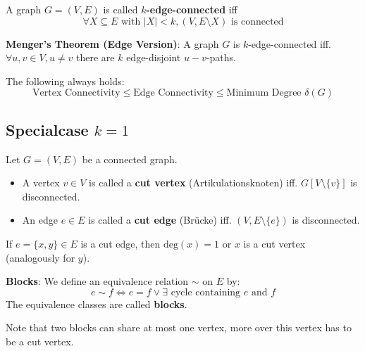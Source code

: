 \begin{definition}
	A graph $G = (V, E)$ is called \textbf{$k$-edge-connected} iff
	$$\forall X \subseteq E \text{ with } |X| \lt k, (V, E \setminus X) \text{ is connected}$$
\end{definition}

\begin{theorem}
	\textbf{Menger's Theorem (Edge Version)}: A graph $G$ is $k$-edge-connected iff. $\forall u, v \in V, u \neq v$ there are $k$ edge-disjoint $u-v$-paths.
\end{theorem}

\begin{remark}
	The following always holds:
	$$\text{Vertex Connectivity} \le \text{Edge Connectivity} \le \text{Minimum Degree } \delta(G)$$
\end{remark}

\subsection{Specialcase $k=1$}

\begin{definition}
	Let $G = (V, E)$ be a connected graph.
	\begin{itemize}
		\item A vertex $v \in V$ is called a \textbf{cut vertex} (Artikulationsknoten) iff. $G[V \setminus \{v\}]$ is disconnected.
		\item An edge $e \in E$ is called a \textbf{cut edge} (Brücke) iff. $(V, E \setminus \{e\})$ is disconnected.
	\end{itemize}
\end{definition}

\begin{lemma}
	If $e = \{x, y\} \in E$ is a cut edge, then $\text{deg}(x) = 1$ or $x$ is a cut vertex (analogously for $y$).
\end{lemma}

\begin{definition}
	\textbf{Blocks}: We define an equivalence relation $\sim$ on $E$ by:
	$$e \sim f \iff e=f \lor \exists \text{ cycle containing } e \text{ and } f$$
	The equivalence classes are called \textbf{blocks}.
\end{definition}

\begin{remark}
	Note that two blocks can share at most one vertex, more over this vertex has to be a cut vertex.
\end{remark}

